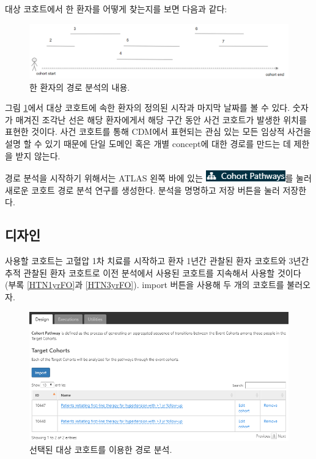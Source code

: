 \documentclass[10.5pt]{book}
\theoremstyle{definition}
\theoremstyle{definition}
\theoremstyle{definition}
\theoremstyle{remark}
\begin{document}
대상 코호트에서 한 환자를 어떻게 찾는지를 보면 다음과 같다:

\begin{figure}

{\centering \includegraphics[width=1\linewidth]{images/Characterization/pathwaysPersonEventView} 

}

\caption{한 환자의 경로 분석의 내용.}\label{fig:pathwaysPersonEventView}
\end{figure}

그림 \ref{fig:pathwaysPersonEventView}에서 대상 코호트에 속한 환자의
정의된 시작과 마지막 날짜를 볼 수 있다. 숫자가 매겨진 조각난 선은 해당
환자에게서 해당 구간 동안 사건 코호트가 발생한 위치를 표현한 것이다.
사건 코호트를 통해 CDM에서 표현되는 관심 있는 모든 임상적 사건을 설명 할
수 있기 때문에 단일 도메인 혹은 개별 concept에 대한 경로를 만드는 데
제한을 받지 않는다.

경로 분석을 시작하기 위해서는 ATLAS 왼쪽 바에 있는
\includegraphics{images/Characterization/atlasPathwaysMenuItem.png}를
눌러 새로운 코호트 경로 분석 연구를 생성한다. 분석을 명명하고 저장
버튼을 눌러 저장한다.

\subsection{디자인}

사용할 코호트는 고혈압 1차 치료를 시작하고 환자 1년간 관찰된 환자
코호트와 3년간 추적 관찰된 환자 코호트로 이전 분석에서 사용된 코호트를
지속해서 사용할 것이다 (부록 \ref{HTN1yrFO}과 \ref{HTN3yrFO}). import
버튼을 사용해 두 개의 코호트를 불러오자.

\begin{figure}

{\centering \includegraphics[width=1\linewidth]{images/Characterization/atlasPathwaysTargetCohorts} 

}

\caption{선택된 대상 코호트를 이용한 경로 분석.}\label{fig:atlasPathwaysTargetCohorts}
\end{figure}
\end{document}
